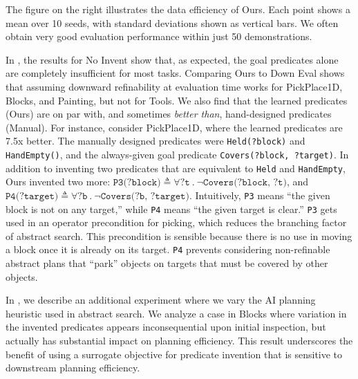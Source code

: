 The figure on the right illustrates the data efficiency of Ours. Each point shows a mean over 10 seeds, with standard deviations shown as vertical bars.
We often obtain very good evaluation performance within just 50 demonstrations.

In , the results for No Invent show that, as expected, the goal predicates alone are completely insufficient for most tasks.
Comparing Ours to Down Eval shows that assuming downward refinability at evaluation time works for PickPlace1D, Blocks, and Painting, but not for Tools.
We also find that the learned predicates (Ours) are on par with, and sometimes \emph{better than}, hand-designed predicates (Manual).
For instance, consider PickPlace1D, where the learned predicates are 7.5x better.
The manually designed predicates were \texttt{Held(?block)} and \texttt{HandEmpty()}, and the always-given goal predicate \texttt{Covers(?block, ?target)}.
In addition to inventing two predicates that are equivalent to \texttt{Held} and \texttt{HandEmpty}, Ours invented two more: $\texttt{P3(?block)} \triangleq \forall \texttt{?t}\ .\ \lnot \texttt{Covers(?block, ?t)}$, and $\texttt{P4(?target)} \triangleq \forall \texttt{?b}\ .\ \lnot \texttt{Covers(?b, ?target)}$. 
Intuitively, \texttt{P3} means ``the given block is not on any target,'' while \texttt{P4} means ``the given target is clear.'' 
\texttt{P3} gets used in an operator precondition for picking, which reduces the branching factor of abstract search.
This precondition is sensible because there is no use in moving a block once it is already on its target.
\texttt{P4} prevents considering non-refinable abstract plans that ``park'' objects on targets that must be covered by other objects.

In , we describe an additional experiment where we vary the AI planning heuristic used in abstract search.
We analyze a case in Blocks where variation in the invented predicates appears inconsequential upon initial inspection, but actually has substantial impact on planning efficiency.
This result underscores the benefit of using a surrogate objective for predicate invention that is sensitive to downstream planning efficiency.
